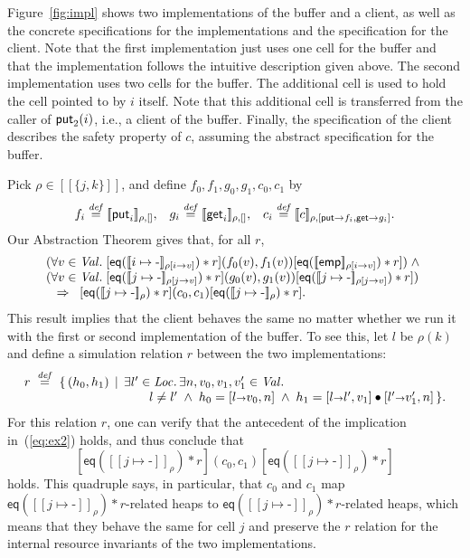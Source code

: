 \documentclass{LMCS}
\newcommand{\blank}{\mbox{-}}
\newcommand{\emp}{\mathsf{emp}}
\newcommand{\pointsto}{\mapsto}
\newcommand{\Loc}{\mathit{Loc}}
\newcommand{\sval}{\mathit{Val}}
\newcommand{\bind}{{\scriptstyle\relax\rightarrow}}
\newcommand{\ff}[1]{[\![#1]\!]}
\newcommand{\squad}[4]{{[{#1}]}
                        ({#2},  {#3})
                       {[{#4}]}}
\newcommand{\EQ}{\mathsf{eq}}
\newcommand{\defeq}{\stackrel{\mathit{def}}{=}}
\begin{document}
Figure~\ref{fig:impl} shows
two implementations of the buffer and a client,
as well as the concrete specifications for
the implementations and the specification for the client.
Note that the first implementation just uses one cell for the buffer
and that the implementation follows the intuitive description given above. 
The second implementation uses two cells for the buffer. The additional
cell is used to hold the cell pointed to by $i$ itself. Note that this
additional cell is transferred from the caller of $\mathsf{put}_2(i)$, i.e.,
a client of the buffer. Finally, the specification of the client
describes the safety property of $c$, assuming the abstract specification 
for the buffer.

Pick $\rho \in \ff{\{j,k\}}$,
and define $f_0,f_1,g_0,g_1,c_0,c_1$ by
$$
f_i \defeq \ff{\putf_i}_{\rho,[]},\;\;\; 
g_i \defeq \ff{\getf_i}_{\rho,[]},\;\;\;
c_i \defeq \ff{c}_{\rho,[\putf\bind f_i, \getf\bind g_i]}.
$$
Our Abstraction Theorem gives that, for all $r$,
\begin{equation}\label{eq:ex2}
\begin{array}{l}
  \begin{array}[t]{@{}l@{}}
  (\forall v \in \sval.\;
  \squad
    {\EQ(\ff{i\pointsto \blank}_{\rho[i\bind v]})*r}
    {f_0(v)}
    {f_1(v)}
    {\EQ(\ff{\emp}_{\rho[i\bind v]})*r})
    \;\land\;
\\
  (\forall v \in \sval.\;
  \squad
    {\EQ(\ff{j\pointsto\blank}_{\rho[j\bind v]})*r}
    {g_0(v)}
    {g_1(v)}
    {\EQ(\ff{j\pointsto\blank}_{\rho[j\bind v]})*r})
  \end{array}
\\
 {}
 \;\;\Rightarrow\;\;
  \squad
    {\EQ(\ff{j\pointsto \blank}_\rho)*r}
    {c_0}
    {c_1}
    {\EQ(\ff{j\pointsto \blank}_\rho)*r}.
\end{array}
\end{equation}
This result implies that the client behaves the same no matter
whether we run it with the first or second implementation of the
buffer. To see this, let $l$ be $\rho(k)$ 
and define a simulation relation
$r$ between the two implementations:
$$
  r \;\defeq\; 
    \{\, (h_0,h_1)\,\mid\,
         \begin{array}[t]{@{}l@{}}
         \exists l' \in \Loc.\,\exists n,v_0,v_1,v_1'\in \sval.\; \\
          \qquad
          l \not= l' \;\land\;
          h_0 = [l\bind v_0,n] \;\land\;
          h_1 = [l\bind l',v_1]\bullet[l'\bind v_1',n]\, \}.
         \end{array}
$$
For this relation $r$, one can verify that the antecedent 
of the implication
in~(\ref{eq:ex2}) holds, and thus conclude that 
$$
  \squad
    {\EQ(\ff{j\pointsto \blank}_\rho)*r}
    {c_0}
    {c_1}
    {\EQ(\ff{j\pointsto \blank}_\rho)*r}
$$
holds. This quadruple says, in particular, 
that $c_0$ and $c_1$ map $\EQ(\ff{j\pointsto \blank}_\rho)*r$-related
heaps to $\EQ(\ff{j\pointsto \blank}_\rho)*r$-related heaps, 
which means
that they behave the same for cell $j$ and preserve the $r$ 
relation for the internal resource invariants of the two
implementations.
\end{document}
